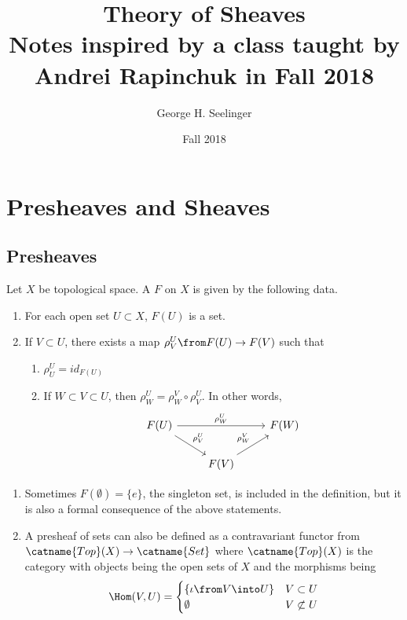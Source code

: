 \documentclass[11pt,leqno,oneside]{amsbook}
\title[Theory of Sheaves]{Theory of Sheaves \\ Notes
  inspired by a class taught by Andrei Rapinchuk in Fall 2018}
\author{George H. Seelinger}
\date{Fall 2018}
\renewcommand{\F}{F}
\numberwithin{thm}{section}
\begin{document}
\maketitle
\section{Presheaves and Sheaves}
\subsection{Presheaves}
\begin{defn}
  Let \(X\) be topological space. A  \(\F\) on
  \(X\) is given by the following data.
  \begin{enumerate}
  \item For each open set \(U \subset X\), \(\F(U)\) is a set.
  \item If \(V \subset U\), there exists a map \(\rho^U_V \from \F(U)
    \to \F(V)\) such that
    \begin{enumerate}
    \item \(\rho_U^U = id_{\F(U)}\)
    \item If \(W \subset V \subset U\), then \(\rho_W^U = \rho_W^V
      \circ \rho_V^U\). In other words, \[
        \begin{tikzcd}
          \F(U) \ar[rd, "\rho_V^U"] \ar[rr, "\rho_W^U"] & & \F(W)\\
          & \F(V) \ar[ur, "\rho_W^V"]&
        \end{tikzcd}
      \]
    \end{enumerate}
  \end{enumerate}
\end{defn}
\begin{rmk}
  \begin{enumerate}
  \item Sometimes \(\F(\emptyset) = \{e\}\), the singleton set, is
    included in the 
    definition, but it is also a formal consequence of the above
    statements.
  \item A presheaf of sets can also be defined as a contravariant
    functor from \(\catname{Top}(X) \to \catname{Set}\) where
    \(\catname{Top}(X)\) is the category with objects being the open
    sets of \(X\) and the morphisms being \[
      \Hom(V,U) =
      \begin{cases}
        \{\iota \from V \into U\} & V \subset U\\
        \emptyset & V \not\subset U
      \end{cases}
    \]
  \end{enumerate}
\end{rmk}
\end{document}

